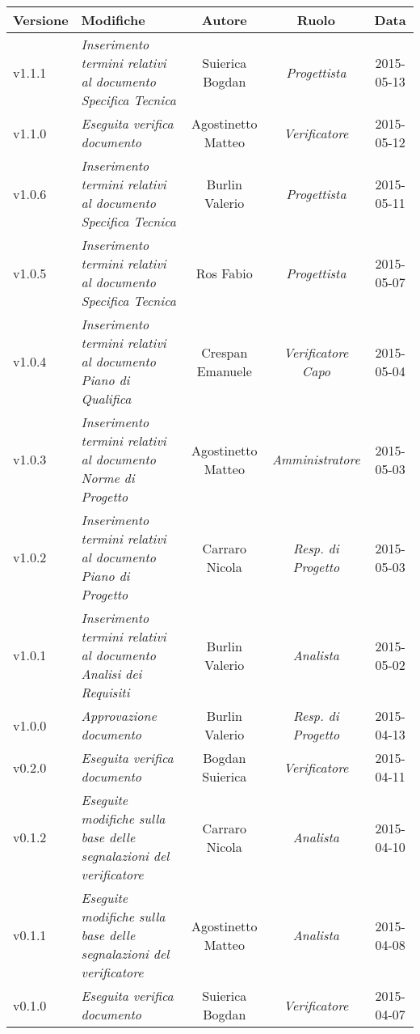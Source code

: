 \newpage

\begin{table}[H]
\centering
\begin{tabular}{|p{}|p{}|c|c|c|}
	\toprule
		\textbf{Versione} & \textbf{Modifiche} & \textbf{Autore} & \textbf{Ruolo} & \textbf{Data} \\
	\midrule
	\midrule
		v1.1.1 & \textit{Inserimento termini relativi al documento Specifica Tecnica} & Suierica Bogdan & \textit{Progettista} & 2015-05-13\\
	\midrule
		v1.1.0 & \textit{Eseguita verifica documento} & Agostinetto Matteo & \textit{Verificatore} & 2015-05-12\\
	\midrule
		v1.0.6 & \textit{Inserimento termini relativi al documento Specifica Tecnica} & Burlin Valerio & \textit{Progettista} & 2015-05-11\\
	\midrule
		v1.0.5 & \textit{Inserimento termini relativi al documento Specifica Tecnica} & Ros Fabio & \textit{Progettista} & 2015-05-07\\
	\midrule
		v1.0.4 & \textit{Inserimento termini relativi al documento Piano di Qualifica} & Crespan Emanuele & \textit{Verificatore Capo} & 2015-05-04\\
	\midrule
		v1.0.3 & \textit{Inserimento termini relativi al documento Norme di Progetto} & Agostinetto Matteo & \textit{Amministratore} & 2015-05-03\\
	\midrule
		 v1.0.2 & \textit{Inserimento termini relativi al documento Piano di Progetto} & Carraro Nicola & \textit{Resp. di Progetto} & 2015-05-03 \\
	\midrule
		  v1.0.1 & \textit{Inserimento termini relativi al documento Analisi dei Requisiti} & Burlin Valerio & \textit{Analista} & 2015-05-02 \\
	\midrule
		v1.0.0 & \textit{Approvazione documento} & Burlin Valerio & \textit{Resp. di Progetto} & 2015-04-13 \\
	\midrule
		v0.2.0 & \textit{Eseguita verifica documento} & Bogdan Suierica & \textit{Verificatore} & 2015-04-11 \\
	\midrule
		v0.1.2 & \textit{Eseguite modifiche sulla base delle segnalazioni del verificatore} & Carraro Nicola & \textit{Analista} & 2015-04-10 \\
	\midrule
		v0.1.1 & \textit{Eseguite modifiche sulla base delle segnalazioni del verificatore} & Agostinetto Matteo & \textit{Analista} & 2015-04-08 \\
	\midrule
		v0.1.0 & \textit{Eseguita verifica documento} & Suierica Bogdan & \textit{Verificatore} & 2015-04-07 \\
	\bottomrule
\end{tabular}	
\end{table}

